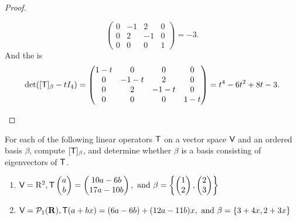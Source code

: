 \begin{proof}
\begin{enumerate}
\[\begin{pmatrix}
        0 & -1 & 2 & 0 \\
        0 & 2 & -1 & 0 \\
        0 & 0 & 0 & 1
    \end{pmatrix} = -3.
\]
And the \CPOLY{} is
\[
    \det([\textsf{T}]_{\beta} - t I_4) = \begin{pmatrix}
        1-t & 0 & 0 & 0 \\
        0 & -1-t & 2 & 0 \\
        0 & 2 & -1-t & 0 \\
        0 & 0 & 0 & 1-t
    \end{pmatrix} = t^4 - 6t^2 + 8t - 3.
\]
\end{enumerate}
\end{proof}

\begin{exercise} \label{exercise 5.1.3}
For each of the following linear operators \(\textsf{T}\) on a vector space \(\textsf{V}\) and an ordered basis \(\beta\), compute \([\textsf{T}]_{\beta}\), and determine whether \(\beta\) is a basis
consisting of eigenvectors of \(\textsf{T}\).

\begin{enumerate}
\item
\(
    \textsf{V} = \mathrm{R}^{2}, \textsf{T}\begin{pmatrix}a \\ b\end{pmatrix}=\begin{pmatrix}10 a-6 b \\ 17 a-10 b\end{pmatrix} , \text{ and } \beta=\left\{\begin{pmatrix}1 \\ 2\end{pmatrix},\begin{pmatrix}2 \\ 3\end{pmatrix}\right\}\)

\item
\(
    \textsf{V}=\mathcal{P}_{1}(\mathbf{R}), \textsf{T}(a+b x)=(6 a-6 b)+(12 a-11 b) x ,
    \text{ and } \beta=\{3+4 x, 2+3 x\}
\)


\end{enumerate}
\end{exercise}
